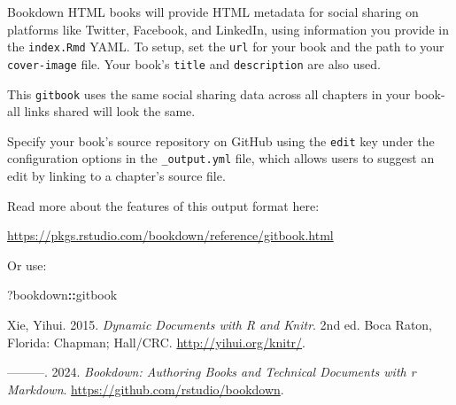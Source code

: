 \documentclass[
]{book}
\newenvironment{Shaded}{\begin{snugshade}}{\end{snugshade}}
\newcommand{\NormalTok}[1]{#1}
\newcommand{\SpecialCharTok}[1]{\textcolor[rgb]{0.81,0.36,0.00}{\textbf{#1}}}
\newlength{\cslhangindent}
\newlength{\cslentryspacingunit} %
\newenvironment{CSLReferences}[2] %
 {%
  \setlength{\parindent}{0pt}
  \ifodd #1
  \let\oldpar\par
  \def\par{\hangindent=\cslhangindent\oldpar}
  \fi
  \setlength{\parskip}{#2\cslentryspacingunit}
 }%
 {}
\theoremstyle{definition}
\theoremstyle{definition}
\theoremstyle{definition}
\theoremstyle{definition}
\theoremstyle{remark}
\begin{document}
Bookdown HTML books will provide HTML metadata for social sharing on platforms like Twitter, Facebook, and LinkedIn, using information you provide in the \texttt{index.Rmd} YAML. To setup, set the \texttt{url} for your book and the path to your \texttt{cover-image} file. Your book's \texttt{title} and \texttt{description} are also used.

This \texttt{gitbook} uses the same social sharing data across all chapters in your book- all links shared will look the same.

Specify your book's source repository on GitHub using the \texttt{edit} key under the configuration options in the \texttt{\_output.yml} file, which allows users to suggest an edit by linking to a chapter's source file.

Read more about the features of this output format here:

\url{https://pkgs.rstudio.com/bookdown/reference/gitbook.html}

Or use:

\begin{Shaded}
\begin{Highlighting}[]
\NormalTok{?bookdown}\SpecialCharTok{::}\NormalTok{gitbook}
\end{Highlighting}
\end{Shaded}

\hypertarget{refs}{}
\begin{CSLReferences}{1}{0}
\leavevmode{}%
Xie, Yihui. 2015. \emph{Dynamic Documents with {R} and Knitr}. 2nd ed. Boca Raton, Florida: Chapman; Hall/CRC. \url{http://yihui.org/knitr/}.

\leavevmode{}%
---------. 2024. \emph{Bookdown: Authoring Books and Technical Documents with r Markdown}. \url{https://github.com/rstudio/bookdown}.

\end{CSLReferences}
\end{document}
